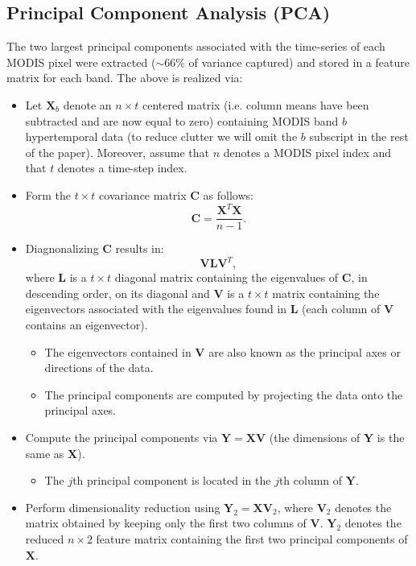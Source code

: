 \documentclass{article}
\begin{document}
\subsection{Principal Component Analysis (PCA)}
\label{sec:PCA}
The two largest principal components associated with the time-series of each MODIS pixel were extracted ($\sim 66$\% of variance captured) and stored in a feature matrix for each band. The above is realized
via:
\begin{itemize}
 \item Let $\mathbf{X}_b$ denote an $n\times t$ centered matrix (i.e. column means have been subtracted and are now equal to zero) containing MODIS band $b$ hypertemporal data (to reduce clutter we will omit the $b$ subscript in the rest of the paper). Moreover, assume that $n$ denotes a MODIS pixel index and that $t$ denotes a time-step index. 
 \item Form the $t\times t$ covariance matrix $\mathbf{C}$ as follows:
\begin{equation}
\mathbf{C} = \frac{\mathbf{X}^T\mathbf{X}}{n-1}. 
\end{equation}
\item Diagnonalizing $\mathbf{C}$ results in:
\begin{equation}
\mathbf{V}\mathbf{L}\mathbf{V}^T,
\end{equation}
where $\mathbf{L}$ is a $t\times t$ diagonal matrix containing the eigenvalues of $\mathbf{C}$, in descending order, on its diagonal and $\mathbf{V}$ is a $t\times t$ matrix 
containing the eigenvectors associated with the eigenvalues found in $\mathbf{L}$ (each column of $\mathbf{V}$ contains an eigenvector). 
\begin{itemize}
\item The eigenvectors contained in 
$\mathbf{V}$ are also known as the principal axes or directions of the data.
\item The principal components are computed by projecting the data onto the principal axes.
\end{itemize}
\item Compute the principal components via $\mathbf{Y} = \mathbf{X}\mathbf{V}$ (the dimensions of $\mathbf{Y}$ is the same as $\mathbf{X}$). 
\begin{itemize}
\item The $j$th principal component is located in the $j$th column of $\mathbf{Y}$. 
\end{itemize}
\item Perform dimensionality reduction using $\mathbf{Y}_2 = \mathbf{X}\mathbf{V}_2$, where $\mathbf{V}_2$ denotes the matrix obtained by keeping only the first two columns of 
$\mathbf{V}$. $\mathbf{Y}_2$ denotes the reduced $n\times 2$ feature matrix containing the first two principal components of $\mathbf{X}$.
\end{itemize}
\end{document}
